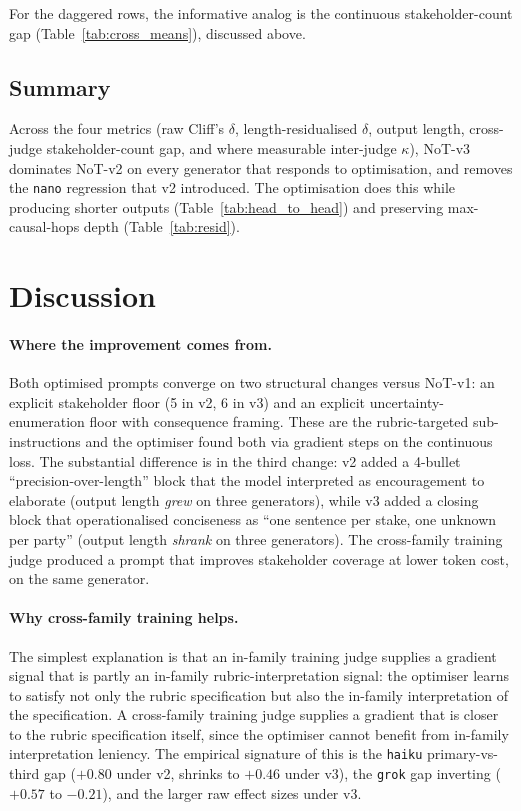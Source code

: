 \documentclass[11pt]{article}
\begin{document}
For the daggered rows, the informative analog is the continuous stakeholder-count gap (Table~\ref{tab:cross_means}), discussed above.

\subsection{Summary}

Across the four metrics (raw Cliff's $\delta$, length-residualised $\delta$, output length, cross-judge stakeholder-count gap, and where measurable inter-judge $\kappa$), NoT-v3 dominates NoT-v2 on every generator that responds to optimisation, and removes the \texttt{nano} regression that v2 introduced.
The optimisation does this while producing shorter outputs (Table~\ref{tab:head_to_head}) and preserving max-causal-hops depth (Table~\ref{tab:resid}).

\section{Discussion}
\label{sec:discussion}

\paragraph{Where the improvement comes from.}
Both optimised prompts converge on two structural changes versus NoT-v1: an explicit stakeholder floor (5 in v2, 6 in v3) and an explicit uncertainty-enumeration floor with consequence framing.
These are the rubric-targeted sub-instructions and the optimiser found both via gradient steps on the continuous loss.
The substantial difference is in the third change: v2 added a 4-bullet ``precision-over-length'' block that the model interpreted as encouragement to elaborate (output length \emph{grew} on three generators), while v3 added a closing block that operationalised conciseness as ``one sentence per stake, one unknown per party'' (output length \emph{shrank} on three generators).
The cross-family training judge produced a prompt that improves stakeholder coverage at lower token cost, on the same generator.

\paragraph{Why cross-family training helps.}
The simplest explanation is that an in-family training judge supplies a gradient signal that is partly an in-family rubric-interpretation signal: the optimiser learns to satisfy not only the rubric specification but also the in-family interpretation of the specification.
A cross-family training judge supplies a gradient that is closer to the rubric specification itself, since the optimiser cannot benefit from in-family interpretation leniency.
The empirical signature of this is the \texttt{haiku} primary-vs-third gap ($+0.80$ under v2, shrinks to $+0.46$ under v3), the \texttt{grok} gap inverting ($+0.57$ to $-0.21$), and the larger raw effect sizes under v3.
\end{document}
